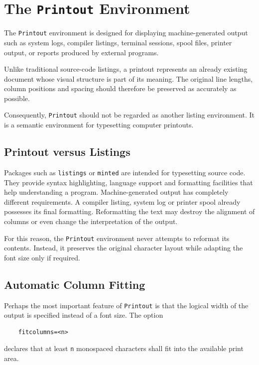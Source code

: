 \documentclass[
11pt,
a4paper,
oneside
]{scrbook}
\begin{document}
{\chapter{The \texttt{Printout} Environment}
\begin{center}
\end{center}
The \texttt{Printout} environment is designed for displaying
machine-generated output such as system logs, compiler listings,
terminal sessions, spool files, printer output, or reports produced by
external programs.

Unlike traditional source-code listings, a printout represents an
already existing document whose visual structure is part of its meaning.
The original line lengths, column positions and spacing should therefore
be preserved as accurately as possible.

Consequently, \texttt{Printout} should not be regarded as another
listing environment. It is a semantic environment for typesetting
computer printouts.

\section{Printout versus Listings}

Packages such as \texttt{listings} or \texttt{minted} are intended for
typesetting source code. They provide syntax highlighting, language
support and formatting facilities that help understanding a program.
Machine-generated output has completely different requirements.
A compiler listing, system log or printer spool already possesses its
final formatting. Reformatting the text may destroy the alignment of
columns or even change the interpretation of the output.

For this reason, the \texttt{Printout} environment never attempts to
reformat its contents. Instead, it preserves the original character
layout while adapting the font size only if required.

\section{Automatic Column Fitting}

Perhaps the most important feature of \texttt{Printout} is that the
logical width of the output is specified instead of a font size.
The option
\begin{verbatim}
	fitcolumns=<n>
\end{verbatim}
declares that at least \texttt{n} monospaced characters shall fit into
the available print area.

}
\end{document}
